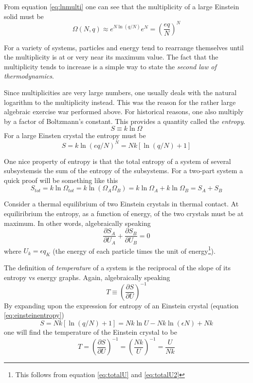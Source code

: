 \documentclass[10pt,a4paper]{amsart}
\begin{document}
From equation \ref{eq:lnmulti} one can see that the multiplicity of a large Einstein solid must be 
\begin{equation}
\label{eq:largemulti}
\Omega (N,q) \approx e^{N \ln (q/N)}e^N= \left(\frac{eq}{N}\right)^N
\end{equation}

For a variety of systems, particles and energy tend to rearrange themselves until the multiplicity is at or very near its maximum value. The fact that the multiplicity tends to increase is a simple way to state the \emph{second law of thermodynamics}.

Since multiplicities are very large numbers, one usually deals with the natural logarithm to the multiplicity instead. This was the reason for the rather large algebraic exercise war performed above. For historical reasons, one also multiply by a factor of Boltzmann's constant. This provides a quantity called the \emph{entropy}.
\begin{equation}
\label{eq:entropy}
S \equiv k \ln \Omega
\end{equation} 
For a large Einsten crystal the entropy must be
\begin{equation}
\label{eq:einsteinentropy}
S=k \ln (eq/N)^N = Nk[\ln (q/N) + 1]
\end{equation}

One nice property of entropy is that the total entropy of a system of several subsystemsis the sum of the entropy of the subsystems. For a two-part system a quick proof will be something like this
\begin{equation}
S_{tot}=k \ln \Omega_{tot} = k \ln (\Omega_A\Omega_B) = k \ln \Omega_A + k \ln \Omega_B = S_A + S_B
\end{equation}

Consider a thermal equilibrium of two Einstein crystals in thermal contact. At equiliribrium the entropy, as a function of energy, of the two crystals must be at maximum. In other words, algebraically speaking
\begin{equation}
\frac{\partial S_A}{\partial U_A} + \frac{\partial S_B}{\partial U_B} = 0
\end{equation}
where $U_k= \epsilon q_K$ (the energy of each particle times the unit of energy\footnote{This follows from equation \ref{eq:totalU} and \ref{eq:totalU2}}). 

The definition of \emph{temperature} of a system is the reciprocal of the slope of its entropy vs energy graphs. Again, algebraically speaking
\begin{equation}
T \equiv \left(\frac{\partial S}{\partial U} \right)^{-1}
\end{equation}
By expanding upon the expression for entropy of an Einstein crystal (equation \ref{eq:einsteinentropy})
\begin{equation}
S= Nk[\ln (q/N) + 1]
= Nk \ln U -Nk \ln (\epsilon N) + Nk
\end{equation}
one will find the temperature of the Einstein crystal to be
\begin{equation}
T = \left(\frac{\partial S}{\partial U} \right)^{-1}
= \left(\frac{Nk}{U} \right)^{-1} = \frac{U}{Nk} 
\end{equation}
\end{document}
